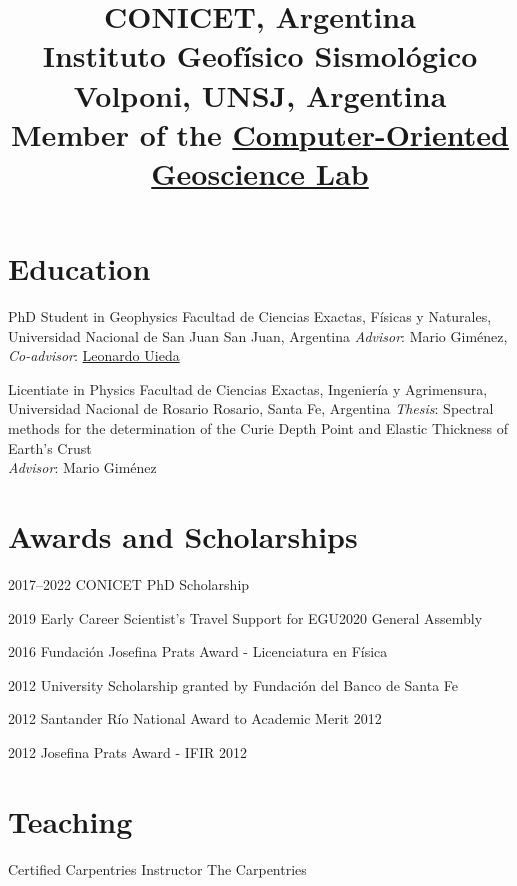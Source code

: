 \documentclass[a4paper,12pt]{moderncv}
\title{
    \small
    CONICET, Argentina
    \\
    Instituto Geofísico Sismológico Volponi, UNSJ, Argentina
    \\
    Member of the
    \href{https://www.compgeolab.org}{Computer-Oriented Geoscience Lab}
}
\newcommand{\leo}{\href{https://www.leouieda.com}{Leonardo Uieda}}
\newcommand{\mario}{Mario Giménez}
\begin{document}
\maketitle


\section{Education}

{PhD Student in Geophysics}
{
    Facultad de Ciencias Exactas, Físicas y Naturales,
    Universidad Nacional de San Juan
}
{San Juan, Argentina}
{}
{\emph{Advisor}: \mario{}, \emph{Co-advisor}: \leo{}}

{Licentiate in Physics}
{
    Facultad de Ciencias Exactas, Ingeniería y Agrimensura,
    Universidad Nacional de Rosario
}
{Rosario, Santa Fe, Argentina}
{}
{
    \emph{Thesis}: Spectral methods for the determination of the Curie Depth
    Point and Elastic Thickness of Earth's Crust
    \\
    \emph{Advisor}: \mario{}
}


\section{Awards and Scholarships}

\cvline
{2017--2022}
{CONICET PhD Scholarship}

\cvline
{2019}
{Early Career Scientist's Travel Support for EGU2020 General Assembly}

\cvline
{2016}
{Fundación Josefina Prats Award - Licenciatura en Física}

\cvline
{2012}
{University Scholarship granted by Fundación del Banco de Santa Fe}

\cvline
{2012}
{Santander Río National Award to Academic Merit 2012}

\cvline
{2012}
{Josefina Prats Award - IFIR 2012}



\section{Teaching}

{Certified Carpentries Instructor} %
{The Carpentries} %
{} %
{} %
{} %
\end{document}
